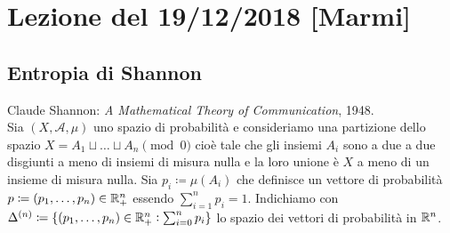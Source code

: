 \section{Lezione del 19/12/2018 [Marmi]}

\subsection{Entropia di Shannon}
Claude Shannon: \emph{A Mathematical Theory of Communication}, 1948. \\

Sia $ (X, \mathcal{A}, \mu) $ uno spazio di probabilità e consideriamo una partizione dello spazio \linebreak $ X = A_1 \sqcup \ldots \sqcup A_n \pmod{0} $ cioè tale che gli insiemi $ A_i $ sono a due a due disgiunti a meno di insiemi di misura nulla e la loro unione è $ X $ a meno di un insieme di misura nulla. Sia $ p_i \coloneqq \mu(A_i) $ che definisce un vettore di probabilità $ p \coloneqq (p_1, \ldots, p_n) \in \mathbb{R}^n_+ $ essendo $ \sum_{i = 1}^{n} p_i = 1 $. Indichiamo con $ \Delta^{(n)} \coloneqq \{(p_1, \ldots, p_n) \in \mathbb{R}^n_+ : \sum_{i=0}^{n} p_i\} $ lo spazio dei vettori di probabilità in $ \mathbb{R}^n $.

